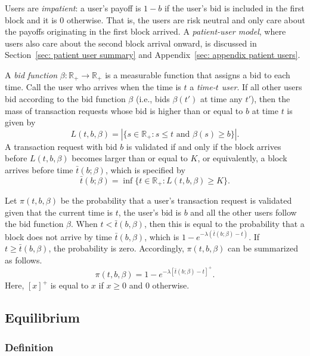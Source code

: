 \documentclass[12pt, letterpaper]{article}
\begin{document}
Users are \emph{impatient}: a user's payoff is $1-b$ if the user's bid is included in the first block and it is $0$ otherwise. That is, the users are risk neutral and only care about the payoffs originating in the first block arrived. A \emph{patient-user model}, where users also care about the second block arrival onward, is discussed in Section~\ref{sec: patient user summary} and Appendix~\ref{sec: appendix patient users}.


A \textit{bid function} $\beta:\mathbb{R}_+\to\mathbb{R}_+$ is a measurable function that assigns a bid to each time. Call the user who arrives when the time is $t$ a \emph{time-$t$ user}. If all other users bid according to the bid function $\beta$ (i.e., bids $\beta(t')$ at time any $t'$), then the mass of transaction requests whose bid is higher than or equal to $b$ at time $t$ is given by
\begin{equation}\label{eq: model 1, L}
    L(t, b, \beta) = |\{s \in \mathbb{R}_+: s \le t \text{ and } \beta(s) \ge b\}|.
\end{equation}
A transaction request with bid $b$ is validated if and only if the block arrives before $L(t, b, \beta)$ becomes larger than or equal to $K$, or equivalently, a block arrives before time $\bar{t}(b; \beta)$, which is specified by
\begin{equation}\label{eq: model 1, bar t}
    \bar{t}(b; \beta) = \inf\{t \in \mathbb{R}_+: L(t, b, \beta) \ge K\}.
\end{equation}

Let $\pi(t, b, \beta)$ be the probability that a user's transaction request is validated given that the current time is $t$, the user's bid is $b$ and all the other users follow the bid function $\beta$. When $t < \bar{t}(b, \beta)$, then this is equal to the probability that a block does not arrive by time $\bar{t}(b, \beta)$, which is $1 - e^{- \lambda(\bar{t}(b;\beta) - t)}$. If $t \ge \bar{t}(b, \beta)$, the probability is zero. Accordingly, $\pi(t, b, \beta)$ can be summarized as follows.
\begin{equation}\label{eq: model 1, pi}
    \pi(t, b, \beta) = 1 - e^{- \lambda[\bar{t}(b; \beta) - t]^+}.
\end{equation}
Here, $[x]^+$ is equal to $x$ if $x \ge 0$ and $0$ otherwise.


\subsection{Equilibrium}

\subsubsection{Definition}
\end{document}
